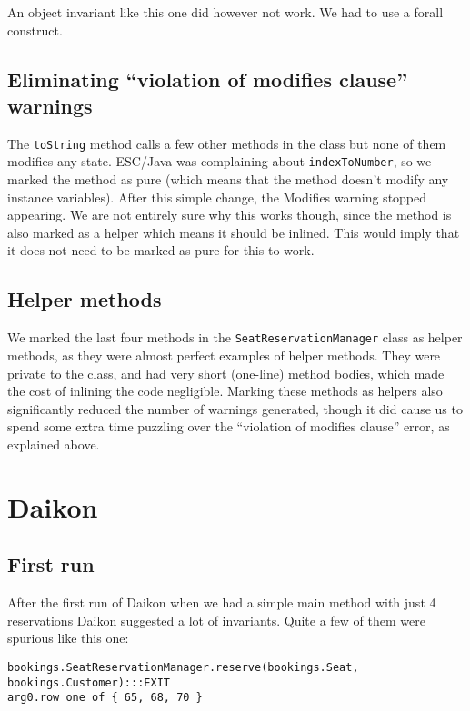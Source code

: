 \documentclass[11pt]{article}
\begin{document}
An object invariant like this one did however not work. We had to use a forall construct.

\subsection{Eliminating ``violation of modifies clause'' warnings}

The \verb|toString| method calls a few other methods in the class but none of them modifies any state. ESC/Java was complaining about \verb|indexToNumber|, so we marked the method as pure (which means that the method doesn't modify any instance variables). After this simple change, the Modifies warning stopped appearing. We are not entirely sure why this works though, since the method is also marked as a helper which means it should be inlined. This would imply that it does not need to be marked as pure for this to work.

\subsection{Helper methods}

We marked the last four methods in the \verb|SeatReservationManager| class as helper methods, as they were almost perfect examples of helper methods. They were private to the class, and had very short (one-line) method bodies, which made the cost of inlining the code negligible. Marking these methods as helpers also significantly reduced the number of warnings generated, though it did cause us to spend some extra time puzzling over the ``violation of modifies clause'' error, as explained above.

\section{Daikon}

\subsection{First run}

After the first run of Daikon when we had a simple main method with just 4 reservations Daikon suggested a lot of invariants. Quite a few of them were spurious like this one:

\noindent
\begin{verbatim}
bookings.SeatReservationManager.reserve(bookings.Seat, bookings.Customer):::EXIT
arg0.row one of { 65, 68, 70 }
\end{verbatim}
\end{document}
